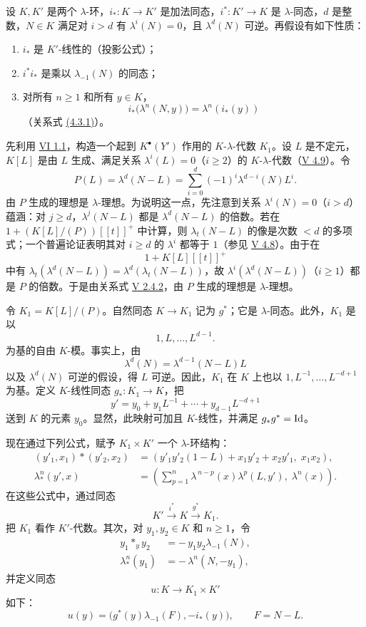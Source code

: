 设 \(K,K'\) 是两个 \(\lambda\)-环，\(i_*:K\to K'\) 是加法同态，\(i^*:K'\to K\) 是 \(\lambda\)-同态，\(d\) 是整数，\(N\in K\) 满足对 \(i>d\) 有 \(\lambda^i(N)=0\)，且 \(\lambda^d(N)\) 可逆。再假设有如下性质：
\begin{enumerate}[label=\roman*)]
\item \(i_*\) 是 \(K'\)-线性的（投影公式）；
\item \(i^*i_*\) 是乘以 \(\lambda_{-1}(N)\) 的同态；
\item 对所有 \(n\ge1\) 和所有 \(y\in K\)，
\[
 i_*\bigl(\lambda^n(N,y)\bigr)=\lambda^n(i_*(y))
\]
（关系式 \hyperlink{sga6.e07.eq.4-3-1}{(4.3.1)}）。
\end{enumerate}

先利用 \hyperlink{sga6.e06.thm.1-1}{VI 1.1}，构造一个起到 \(K^\bullet(Y')\) 作用的 \(K\)-\(\lambda\)-代数 \(K_1\)。设 \(L\) 是不定元，\(K[L]\) 是由 \(L\) 生成、满足关系 \(\lambda^i(L)=0\)（\(i\ge2\)）的 \(K\)-\(\lambda\)-代数（\hyperlink{sga6.e05.cor.4-9}{V 4.9}）。令
\[
  P(L)=\lambda^d(N-L)=\sum_{i=0}^{d}(-1)^i\lambda^{d-i}(N)L^i.
\]
由 \(P\) 生成的理想是 \(\lambda\)-理想。为说明这一点，先注意到关系 \(\lambda^i(N)=0\)（\(i>d\)）蕴涵：对 \(j\ge d\)，\(\lambda^j(N-L)\) 都是 \(\lambda^d(N-L)\) 的倍数。若在 \(1+(K[L]/(P))[[t]]^+\) 中计算，则 \(\lambda_t(N-L)\) 的像是次数 \(<d\) 的多项式；一个普遍论证表明其对 \(i\ge d\) 的 \(\lambda^i\) 都等于 \(1\)（参见 \hyperlink{sga6.e05.prop.4-8}{V 4.8}）。由于在
\[
1+K[L][[t]]^+
\]
中有 \(\lambda_t(\lambda^d(N-L))=\lambda^d(\lambda_t(N-L))\)，故 \(\lambda^i(\lambda^d(N-L))\)（\(i\ge1\)）都是 \(P\) 的倍数。于是由关系式 \hyperlink{sga6.e05.eq.2-4-2}{V 2.4.2}，由 \(P\) 生成的理想是 \(\lambda\)-理想。

令 \(K_1=K[L]/(P)\)。自然同态 \(K\to K_1\) 记为 \(g^*\)；它是 \(\lambda\)-同态。此外，\(K_1\) 是以
\[
  1,L,\ldots,L^{d-1}.
\]
为基的自由 \(K\)-模。事实上，由
\[
  \lambda^d(N)=\lambda^{d-1}(N-L)L
\]
以及 \(\lambda^d(N)\) 可逆的假设，得 \(L\) 可逆。因此，\(K_1\) 在 \(K\) 上也以 \(1,L^{-1},\ldots,L^{-d+1}\) 为基。定义 \(K\)-线性同态 \(g_*:K_1\to K\)，把
\[
y'=y_0+y_1L^{-1}+\cdots+y_{d-1}L^{-d+1}
\]
送到 \(K\) 的元素 \(y_0\)。显然，此映射可加且 \(K\)-线性，并满足 \(g_*g^*=\operatorname{Id}\)。

现在通过下列公式，赋予 \(K_1\times K'\) 一个 \(\lambda\)-环结构：
\begin{align}
 (y'_1,x_1)*(y'_2,x_2)
   &=(y'_1y'_2(1-L)+x_1y'_2+x_2y'_1,\; x_1x_2), \tag{4.7.1}\\
 \lambda^n_*(y',x)
   &=\left(\sum_{p=1}^{n}\lambda^{\,n-p}(x)\lambda^p(L,y'),\;\lambda^n(x)\right). \tag{4.7.2}
\end{align}
在这些公式中，通过同态
\[
  K'\xrightarrow{i^*}K\xrightarrow{g^*}K_1.
\]
把 \(K_1\) 看作 \(K'\)-代数。其次，对 \(y_1,y_2\in K\) 和 \(n\ge1\)，令
\begin{align}
 y_1*_y y_2&=-\,y_1y_2\lambda_{-1}(N), \tag{4.7.3}\\
 \lambda^n_*(y_1)&=-\,\lambda^n(N,-y_1), \tag{4.7.4}
\end{align}
并定义同态
\[
  u:K\longrightarrow K_1\times K'
\]
如下：
\[
  u(y)=\bigl(g^*(y)\lambda_{-1}(F),-i_*(y)\bigr),
  \qquad F=N-L.
\]

